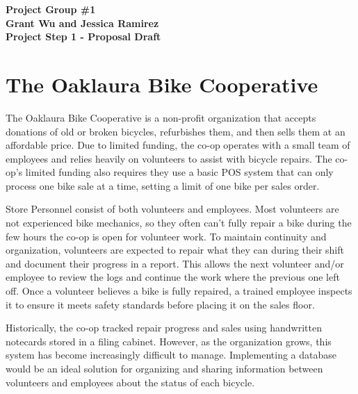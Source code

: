 \documentclass{article}
\begin{document}
\begin{center}
\large\textcolor{primarycolor}{\textbf{Project Group \#1}}\\[0.3cm]
\large\textbf{Grant Wu and Jessica Ramirez}\\[0.3cm]
\huge\textbf{Project Step 1 - Proposal Draft}\\[1.25cm]
\end{center}

\section{The Oaklaura Bike Cooperative}

\begin{tcolorbox}[colback=secondarycolor, colframe=primarycolor, arc=5mm]
\begingroup
\large
The Oaklaura Bike Cooperative is a non-profit organization that accepts donations of old or broken bicycles, refurbishes them, and then sells them at an affordable price. Due to limited funding, the co-op operates with a small team of employees and relies heavily on volunteers to assist with bicycle repairs. The co-op’s limited funding also requires they use a basic POS system that can only process one bike sale at a time, setting a limit of one bike per sales order.

\vspace{0.2cm}

Store Personnel consist of both volunteers and employees. Most volunteers are not experienced bike mechanics, so they often can't fully repair a bike during the few hours the co-op is open for volunteer work. To maintain continuity and organization, volunteers are expected to repair what they can during their shift and document their progress in a report. This allows the next volunteer and/or employee to review the logs and continue the work where the previous one left off. Once a volunteer believes a bike is fully repaired, a trained employee inspects it to ensure it meets safety standards before placing it on the sales floor.

\vspace{0.2cm}

Historically, the co-op tracked repair progress and sales using handwritten notecards stored in a filing cabinet. However, as the organization grows, this system has become increasingly difficult to manage. Implementing a database would be an ideal solution for organizing and sharing information between volunteers and employees about the status of each bicycle.

\endgroup
\end{tcolorbox}
\end{document}
